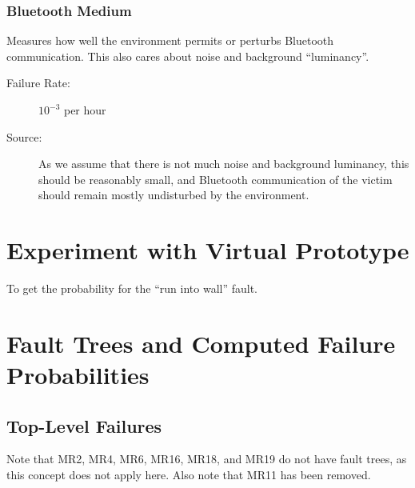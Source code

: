 \documentclass[a4paper,parskip,headheight=38pt]{scrartcl} %
\begin{document}
\subsubsection{Bluetooth Medium}
Measures how well the environment permits or perturbs Bluetooth communication.
This also cares about noise and background \enquote{luminancy}.
\begin{description}
\item[Failure Rate:] $10^{-3}$ per hour
\item[Source:] As we assume that there is not much noise and background
luminancy, this should be reasonably small, and Bluetooth communication
of the victim should remain mostly undisturbed by the environment.
\end{description}

\section{Experiment with Virtual Prototype}
To get the probability for the \enquote{run into wall} fault.


\section{Fault Trees and Computed Failure Probabilities}

\subsection*{Top-Level Failures}

Note that MR2, MR4, MR6, MR16, MR18, and MR19 do
not have fault trees, as this concept does not apply here.  Also note
that MR11 has been removed.

\newcommand{\refpdf}[1]{(see \href{trees/#1.pdf}{\texttt{#1.pdf}})\\}
\end{document}
